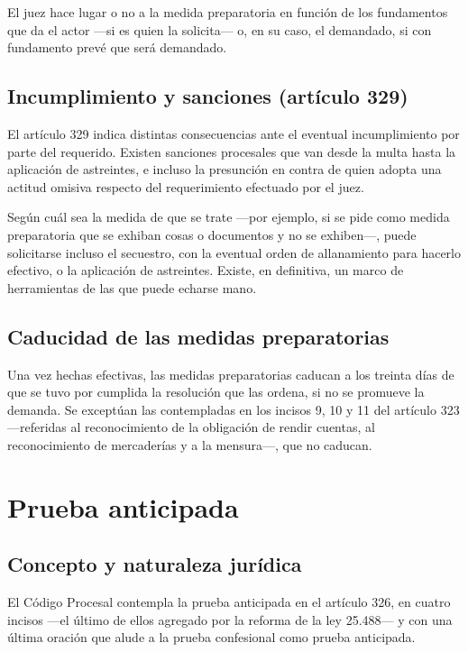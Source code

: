\documentclass[12pt,oneside]{book}
\begin{document}
El juez hace lugar o no a la medida preparatoria en función de los fundamentos que da el actor —si es quien la solicita— o, en su caso, el demandado, si con fundamento prevé que será demandado.

\section{Incumplimiento y sanciones (artículo 329)}

El artículo 329 indica distintas consecuencias ante el eventual incumplimiento por parte del requerido. Existen sanciones procesales que van desde la multa hasta la aplicación de astreintes, e incluso la presunción en contra de quien adopta una actitud omisiva respecto del requerimiento efectuado por el juez.

Según cuál sea la medida de que se trate —por ejemplo, si se pide como medida preparatoria que se exhiban cosas o documentos y no se exhiben—, puede solicitarse incluso el secuestro, con la eventual orden de allanamiento para hacerlo efectivo, o la aplicación de astreintes. Existe, en definitiva, un marco de herramientas de las que puede echarse mano.

\section{Caducidad de las medidas preparatorias}

\begin{important}
Una vez hechas efectivas, las medidas preparatorias caducan a los treinta días de que se tuvo por cumplida la resolución que las ordena, si no se promueve la demanda. Se exceptúan las contempladas en los incisos 9, 10 y 11 del artículo 323 —referidas al reconocimiento de la obligación de rendir cuentas, al reconocimiento de mercaderías y a la mensura—, que no caducan.
\end{important}

\chapter{Prueba anticipada}

\section{Concepto y naturaleza jurídica}

El Código Procesal contempla la prueba anticipada en el artículo 326, en cuatro incisos —el último de ellos agregado por la reforma de la ley 25.488— y con una última oración que alude a la prueba confesional como prueba anticipada.
\end{document}
